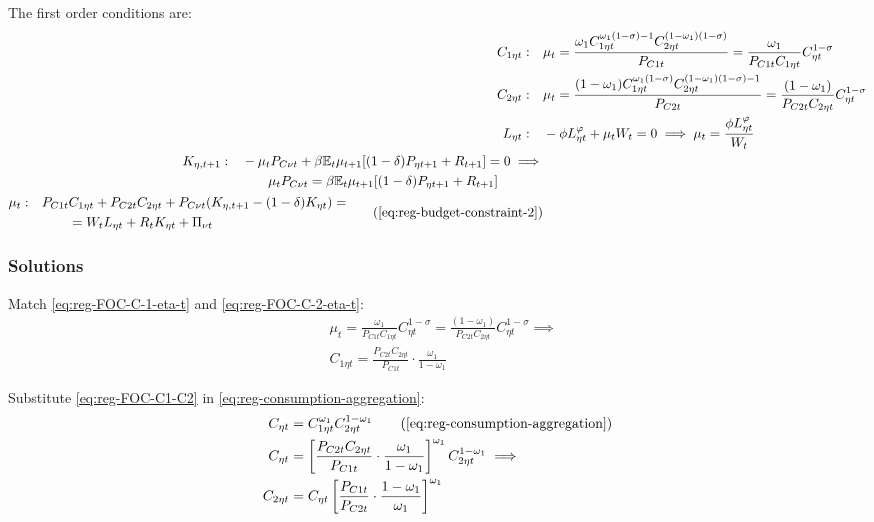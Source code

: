\documentclass[
	thesis.tex
	]{subfiles}
\begin{document}
The first order conditions are:
\begin{align}
	C_{1\eta t}: \quad & \mu_t = \frac{\omega_1 C_{1\eta t}^{\omega_1 (1 -\sigma) -1} C_{2\eta t}^{(1 -\omega_1)(1 -\sigma)}}{P_{C1t}} = \frac{\omega_1}{P_{C1t} C_{1\eta t}} C_{\eta t}^{1 -\sigma} \label{eq:reg-FOC-C-1-eta-t} \\
	C_{2\eta t}: \quad & \mu_t = \frac{(1 -\omega_1) C_{1\eta t}^{\omega_1 (1 -\sigma)} C_{2\eta t}^{(1 -\omega_1)(1 -\sigma)-1}}{P_{C2t}} = \frac{(1 -\omega_1)}{P_{C2t} C_{2\eta t}} C_{\eta t}^{1 -\sigma} \label{eq:reg-FOC-C-2-eta-t} \\
	L_{\eta t}: \quad & -\phi L_{\eta t}^{\varphi} +\mu_t W_t = 0 \implies \mu_t = \frac{\phi L_{\eta t}^{\varphi}}{W_t} \label{eq:reg-household-FOC-Lt} \\
	\begin{split}
		K_{\eta, t+1}: \quad & -\mu_t P_{C\nu t} +\beta \mathbb{E}_t \mu_{t+1} [(1-\delta) P_{\eta t+1} + R_{t+1}] = 0 \implies \\ & \qquad \mu_t P_{C\nu t} = \beta \mathbb{E}_t \mu_{t+1} [(1-\delta) P_{\eta t+1} + R_{t+1}]
	\end{split} \label{eq:reg-household-FOC-Kt} \\
	\begin{split}
		\mu_t: \quad & P_{C1t} C_{1\eta t} + P_{C2t} C_{2\eta t} + P_{C\nu t} (K_{\eta, t+1} - (1-\delta)K_{\eta t}) = \\ & \qquad = W_t L_{\eta t} + R_t K_{\eta t} + \Pi_{\nu t}
	\end{split} \tag{\ref{eq:reg-budget-constraint-2}}
\end{align}

\subsubsection*{Solutions}

Match \ref{eq:reg-FOC-C-1-eta-t} and \ref{eq:reg-FOC-C-2-eta-t}:
\begin{align}
	& \mu_t = \frac{\omega_1}{P_{C1t} C_{1\eta t}} C_{\eta t}^{1 -\sigma} = \frac{(1 -\omega_1)}{P_{C2t} C_{2\eta t}} C_{\eta t}^{1 -\sigma} \implies \nonumber \\
	& C_{1\eta t} = \frac{P_{C2t} C_{2\eta t}}{P_{C1t}} \cdot \frac{\omega_1}{1 -\omega_1} \label{eq:reg-FOC-C1-C2}
\end{align}

Substitute \ref{eq:reg-FOC-C1-C2} in \ref{eq:reg-consumption-aggregation}:
\begin{align}
	C_{\eta t} &= C_{1\eta t}^{\omega_1} C_{2\eta t}^{1-\omega_1} \tag{\ref{eq:reg-consumption-aggregation}} \\
	C_{\eta t} &= \left[ \frac{P_{C2t} C_{2\eta t}}{P_{C1t}} \cdot \frac{\omega_1}{1 -\omega_1} \right]^{\omega_1} C_{2\eta t}^{1-\omega_1} \implies \nonumber \\
	C_{2\eta t} &= C_{\eta t} \left[ \frac{P_{C1t} }{P_{C2t}} \cdot \frac{1 -\omega_1}{\omega_1} \right]^{\omega_1} \label{eq:reg-C2-Cn}
\end{align}
\end{document}
